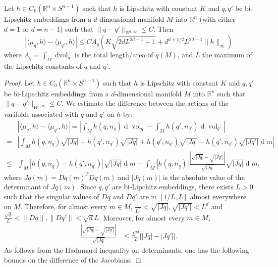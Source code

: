 \documentclass[10pt,a4paper]{amsart}
\newcommand{\R}{\mathbb{R}}
\begin{document}
\begin{thm}\label{thm:stability_shape}
    Let $h\in C_0(\R^n\times S^{n-1})$ such that $h$ is Lipschitz with constant $K$ and $q,q'$ be bi-Lipschitz embeddings from a $d$-dimensional manifold $M$ into $\R^{n}$ (with either $d=1$ or $d=n-1$) such that $\|q - q'\|_{W^{1,\infty}} \leq C$. Then 
    \begin{equation}
        |\langle\mu_{q},h\rangle - \langle\mu_{q'},h\rangle| \leq CA_q(K\sqrt{2dL^{2d-1} + 1}+d^{d+1/2}L^{2d+1}\|h\|_{\infty})
    \end{equation}
    where $A_q = \int_M\operatorname{d vol}_q$ is the total length/area of $q(M)$, and $L$ the maximum of the Lipschitz constants of $q$ and $q'$.
\end{thm}

\begin{proof}
    Let $h\in C_0(\R^n\times S^{n-1})$ such that $h$ is Lipschitz with constant $K$ and $q,q'$ be bi-Lipschitz embeddings from a $d$-dimensional manifold $M$ into $\R^{n}$ such that $\|q - q'\|_{W^{1,\infty}} \leq C$. We estimate the difference between the actions of the varifolds associated with $q$ and $q'$ on $h$ by:
\begin{align}    
    &|\langle\mu_q,h\rangle-\langle\mu_{q'},h\rangle|= \left|\int_{M} h(q,n_{q}) \operatorname{d} \operatorname{vol}_q -  \int_{M}h(q',n_{q'}) \operatorname{d}\operatorname{vol}_{q'}\right|\\
    =&\left|\int_{M} h(q,n_{q})\sqrt{|Jq|} - h(q',n_{q'})\sqrt{|Jq|}+ h(q',n_{q'})\sqrt{|Jq|} - h(q',n_{q'})\sqrt{|Jq'|} \operatorname{d}m\right|\\
    \leq&\int_{M} \left|h(q,n_q)-h(q',n_{q'})\right| \sqrt{|Jq|} \operatorname{d}m + \int_{M} |h(q,n_q)|\frac{\left|\sqrt{|Jq|}-\sqrt{|Jq'|}\right|}{\sqrt{|Jq|}} \sqrt{|Jq|}\operatorname{d}m.
\end{align}
where $Jq(m)=Dq(m)^T Dq(m)$ and $|Jq(m)|$ is the absolute value of the determinant of $Jq(m)$. Since $q,q'$ are bi-Lipchitz embeddings, there exists $L>0$ such that the singular values of $Dq$ and $Dq'$ are in $[1/L,L]$ almost everywhere on $M$. Therefore, for almost every $m\in M$, $\frac{1}{L^d}<\sqrt{|Jq|},\sqrt{|Jq'|}<L^d$ and $\frac{\sqrt{d}}{L}<\|Dq\|,\|Dq'\|<\sqrt{d}L$.
Moreover, for almost every $m\in M$, 
\begin{align*}
    \frac{\left|\sqrt{|Jq|}-\sqrt{|Jq'|}\right|}{\sqrt{|Jq|}} &\leq \frac{L^{2d}}{2}\left||Jq|-|Jq'|\right|.
\end{align*}
As follows from the Hadamard inequality on determinants, one has the following bounds on the difference of the Jacobians:

\end{proof}
\end{document}
